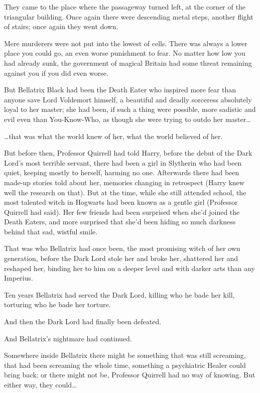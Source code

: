 They came to the place where the passageway turned left, at the corner of the triangular building. Once again there were descending metal steps, another flight of stairs; once again they went down.

Mere murderers were not put into the lowest of cells. There was always a lower place you could go, an even worse punishment to fear. No matter how low you had already sunk, the government of magical Britain had some threat remaining against you if you did even worse.

But Bellatrix Black had been the Death Eater who inspired more fear than anyone save Lord Voldemort himself, a beautiful and deadly sorceress absolutely loyal to her master; she had been, if such a thing were possible, more sadistic and evil even than You-Know-Who, as though she were trying to outdo her master{\ldots}

{\ldots}that was what the world knew of her, what the world believed of her.

But before then, Professor Quirrell had told Harry, before the debut of the Dark Lord's most terrible servant, there had been a girl in Slytherin who had been quiet, keeping mostly to herself, harming no one. Afterwards there had been made-up stories told about her, memories changing in retrospect (Harry knew well the research on that). But at the time, while she still attended school, the most talented witch in Hogwarts had been known as a gentle girl (Professor Quirrell had said). Her few friends had been surprised when she'd joined the Death Eaters, and more surprised that she'd been hiding so much darkness behind that sad, wistful smile.

That was who Bellatrix had once been, the most promising witch of her own generation, before the Dark Lord stole her and broke her, shattered her and reshaped her, binding her to him on a deeper level and with darker arts than any Imperius.

Ten years Bellatrix had served the Dark Lord, killing who he bade her kill, torturing who he bade her torture.

And then the Dark Lord had finally been defeated.

And Bellatrix's nightmare had continued.

Somewhere inside Bellatrix there might be something that was still screaming, that had been screaming the whole time, something a psychiatric Healer could bring back; or there might not be, Professor Quirrell had no way of knowing. But either way, they could{\ldots}

